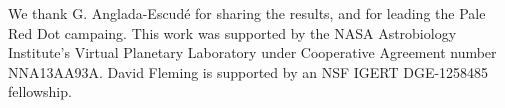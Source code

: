 \documentclass[preprint,12pt]{aastex}
\begin{document}
\vspace{1cm} We thank G. Anglada-Escud{\' e} for sharing the results,
and for leading the Pale Red Dot campaing. This work was supported by
the NASA Astrobiology Institute's Virtual Planetary Laboratory under
Cooperative Agreement number NNA13AA93A.  David Fleming is supported
by an NSF IGERT DGE-1258485 fellowship.



\end{document}

